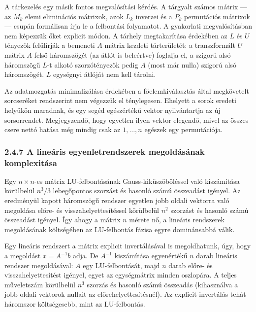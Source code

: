\documentclass[
  magyar,
  11pt]{article}
\begin{document}
A tárkezelés egy másik fontos megvalósítási kérdés. A tárgyalt számos
mátrix --- az \(M_k\) elemi eliminációs mátrixok, azok \(L_k\) inverzei
és a \(P_k\) permutációs mátrixok --- csupán formálisan írja le a
felbontási folyamatot. A gyakorlati megvalósításban nem képezzük őket
explicit módon. A tárhely megtakarítása érdekében az \(L\) és \(U\)
tényezők felülírják a bemeneti \(A\) mátrix kezdeti tárterületét: a
transzformált \(U\) mátrix \(A\) felső háromszögét (az átlót is
beleértve) foglalja el, a szigorú alsó háromszögű \(L\)-t alkotó
szorzótényezők pedig \(A\) (most már nulla) szigorú alsó háromszögét.
\(L\) egységnyi átlóját nem kell tárolni.

Az adatmozgatás minimalizálása érdekében a főelemkiválasztás által
megkövetelt sorcseréket rendszerint nem végezzük el ténylegesen.
Ehelyett a sorok eredeti helyükön maradnak, és egy segéd egészértékű
vektor nyilvántartja az új sorsorrendet. Megjegyzendő, hogy egyetlen
ilyen vektor elegendő, mivel az összes csere nettó hatása még mindig
csak az \(1, \ldots, n\) egészek egy permutációja.

\subsubsection{2.4.7 A lineáris egyenletrendszerek megoldásának
komplexitása}\label{a-lineuxe1ris-egyenletrendszerek-megolduxe1suxe1nak-komplexituxe1sa}

Egy \(n \times n\)-es mátrix LU-felbontásának Gauss-kiküszöböléssel való
kiszámítása körülbelül \(n^3/3\) lebegőpontos szorzást és hasonló számú
összeadást igényel. Az eredményül kapott háromszögű rendszer egyetlen
jobb oldali vektorra való megoldása előre- és visszahelyettesítéssel
körülbelül \(n^2\) szorzást és hasonló számú összeadást igényel. Így
ahogy a mátrix \(n\) mérete nő, a lineáris rendszerek megoldásának
költségében az LU-felbontás fázisa egyre dominánsabbá válik.

Egy lineáris rendszert a mátrix explicit invertálásával is megoldhatunk,
úgy, hogy a megoldást \(x = A^{-1}b\) adja. De \(A^{-1}\) kiszámítása
egyenértékű \(n\) darab lineáris rendszer megoldásával: \(A\) egy
LU-felbontását, majd \(n\) darab előre- és visszahelyettesítést igényel,
egyet az egységmátrix minden oszlopára. A teljes műveletszám körülbelül
\(n^3\) szorzás és hasonló számú összeadás (kihasználva a jobb oldali
vektorok nullait az előrehelyettesítésnél). Az explicit invertálás tehát
háromszor költségesebb, mint az LU-felbontás.
\end{document}
